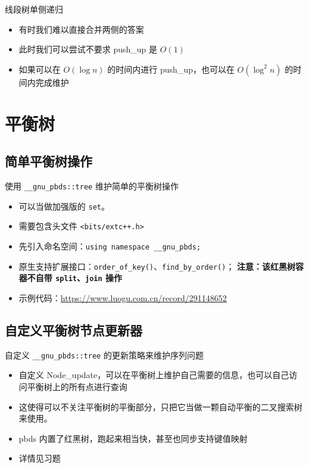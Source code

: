 ﻿\documentclass[aspectratio=169]{ctexbeamer}
\begin{document}
\begin{frame}{线段树单侧递归}
    \begin{itemize}
        \item 有时我们难以直接合并两侧的答案
        \item 此时我们可以尝试不要求 push\_up 是 $O(1)$
        \item 如果可以在 $O(\log n)$ 的时间内进行 push\_up，也可以在 $O(\log^2n)$ 的时间内完成维护
    \end{itemize}
\end{frame}


\section{平衡树}
\subsection{简单平衡树操作}
\begin{frame}{使用 \texttt{\_\_gnu\_pbds::tree} 维护简单的平衡树操作}
    \begin{itemize}
        \item 可以当做加强版的 \texttt{set}。
        \item 需要包含头文件 \texttt{<bits/extc++.h>}
        \item 先引入命名空间：\texttt{using namespace \_\_gnu\_pbds;}
        \item 原生支持扩展接口：\texttt{order\_of\_key()}、\texttt{find\_by\_order()}；
              \textbf{注意：该红黑树容器不自带 \texttt{split}、\texttt{join} 操作}
        \item 示例代码：\url{https://www.luogu.com.cn/record/291148652}
    \end{itemize}
\end{frame}

\subsection{自定义平衡树节点更新器}
\begin{frame}{自定义 \texttt{\_\_gnu\_pbds::tree} 的更新策略来维护序列问题}
    \begin{itemize}
        \item 自定义 Node_update，可以在平衡树上维护自己需要的信息，也可以自己访问平衡树上的所有点进行查询
        \item 这使得可以不关注平衡树的平衡部分，只把它当做一颗自动平衡的二叉搜索树来使用。
        \item pbds 内置了红黑树，跑起来相当快，甚至也同步支持键值映射
        \item 详情见习题
    \end{itemize}
\end{frame}
\end{document}
